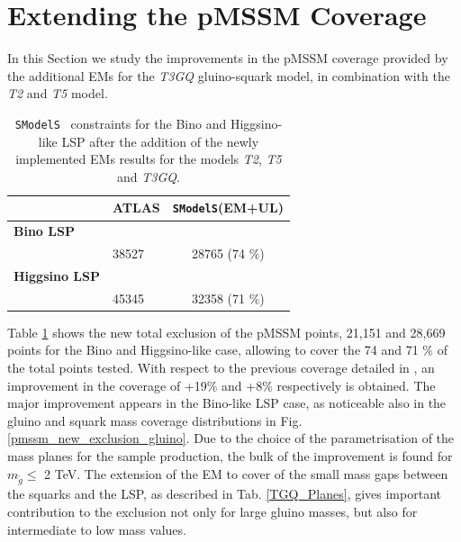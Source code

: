 \documentclass[a4paper,11pt]{article}
\newcommand{\SMO}{\texttt{SModelS\xspace}}
\begin{document}
\section{Extending the pMSSM Coverage}\label{sec::impact}
In this Section we study the improvements in the pMSSM coverage provided by the additional EMs for the \textit{T3GQ} gluino-squark model, in combination with the \textit{T2} and \textit{T5} model. 
\\
%
\begin{table}[!h]
	\footnotesize
	\begin{center}
		\renewcommand{\arraystretch}{1.3}
		\begin{tabular}{l l c }  \toprule  \toprule 
			& \textbf{ATLAS} & \textbf{\SMO (EM+UL)} \\ \toprule \toprule 
			\textbf{Bino LSP} & &  \\
			& 38527 & 28765 (74 $\% $) \\ 
			\textbf{Higgsino LSP} & &   \\
			& 45345 & 32358 (71 $\% $) \\ \bottomrule   \bottomrule  
		\end{tabular}
	\end{center}
	\caption{\SMO~ constraints for the Bino and Higgsino-like LSP after the addition of the newly implemented EMs results for the models \textit{T2}, \textit{T5} and \textit{T3GQ}.}
	\label{Res_Tab_New}
\end{table}
%
Table \ref{Res_Tab_New} shows the new total exclusion of the pMSSM points, 21,151 and 28,669 points for the Bino and Higgsino-like case, allowing to cover the 74 and 71 $\%$ of the total points tested. With respect to the previous coverage detailed in \cite{Ambrogi:2017lov}, an improvement in the coverage of +19$\%$ and +8$\%$ respectively is obtained.
%
The major improvement appears in the Bino-like LSP case, as noticeable also in the gluino and squark mass coverage distributions in Fig. \ref{pmssm_new_exclusion_gluino}. Due to the choice of the parametrisation of the mass planes for the sample production, the bulk of the improvement is found for $m_{\tilde g}\leq$ 2 TeV. The extension of the EM to cover of the small mass gaps between the squarks and the LSP, as described in Tab. \ref{TGQ_Planes}, gives important contribution to the exclusion not only for large gluino masses, but also for intermediate to low mass values.
%
\end{document}
